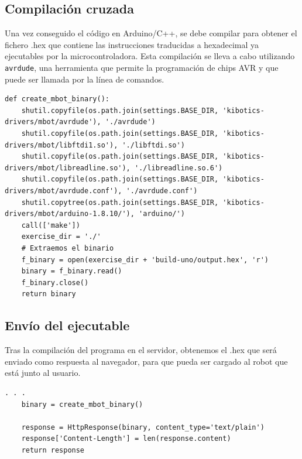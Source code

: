 \documentclass{report}
\begin{document}
\subsection{Compilación cruzada}

Una vez conseguido el código en Arduino/C++, se debe compilar para obtener el fichero .hex que contiene las instrucciones traducidas a hexadecimal ya ejecutables por la microcontroladora. Esta compilación se lleva a cabo utilizando \texttt{avrdude}, una herramienta que permite la programación de chips AVR y que puede ser llamada por la línea de comandos. 
\\
\begin{lstlisting}[frame=single,breaklines=true, label=Compilado y obtención del .hex, caption=Compilado y obtención del .hex, captionpos=b]
def create_mbot_binary():
    shutil.copyfile(os.path.join(settings.BASE_DIR, 'kibotics-drivers/mbot/avrdude'), './avrdude')
    shutil.copyfile(os.path.join(settings.BASE_DIR, 'kibotics-drivers/mbot/libftdi1.so'), './libftdi.so')
    shutil.copyfile(os.path.join(settings.BASE_DIR, 'kibotics-drivers/mbot/libreadline.so'), './libreadline.so.6')
    shutil.copyfile(os.path.join(settings.BASE_DIR, 'kibotics-drivers/mbot/avrdude.conf'), './avrdude.conf')
    shutil.copytree(os.path.join(settings.BASE_DIR, 'kibotics-drivers/mbot/arduino-1.8.10/'), 'arduino/')
    call(['make'])
    exercise_dir = './'
    # Extraemos el binario
    f_binary = open(exercise_dir + 'build-uno/output.hex', 'r')
    binary = f_binary.read()
    f_binary.close()
    return binary
\end{lstlisting}

\subsection{Envío del ejecutable}

Tras la compilación del programa en el servidor, obtenemos el .hex que será enviado como respuesta al navegador, para que pueda ser cargado al robot que está junto al usuario.
\\
\begin{lstlisting}[frame=single,breaklines=true, label=Respuesta a la petición que envió el navegador, caption=Respuesta a la petición que envió el navegador, captionpos=b]
    . . .
    binary = create_mbot_binary()

    response = HttpResponse(binary, content_type='text/plain')
    response['Content-Length'] = len(response.content)
    return response
\end{lstlisting}
\end{document}
